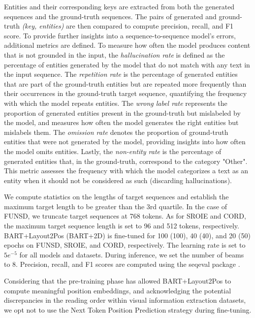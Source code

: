 Entities and their corresponding keys are extracted from both the generated sequences and the ground-truth sequences. The pairs of generated and ground-truth \textit{(key, entities)} are then compared to compute precision, recall, and F1 score. To provide further insights into a sequence-to-sequence model's errors, additional metrics are defined. To measure how often the model produces content that is not grounded in the input, the \textit{hallucination rate} is defined as the percentage of entities generated by the model that do not match with any text in the input sequence. The \textit{repetition rate} is the percentage of generated entities that are part of the ground-truth entities but are repeated more frequently than their occurrences in the ground-truth target sequence, quantifying the frequency with which the model repeats entities. The \textit{wrong label rate} represents the proportion of generated entities present in the ground-truth but mislabeled by the model, and measures how often the model generates the right entities but mislabels them. The \textit{omission rate} denotes the proportion of ground-truth entities that were not generated by the model, providing insights into how often the model omits entities. Lastly, the \textit{non-entity rate} is the percentage of generated entities that, in the ground-truth, correspond to the category "Other". This metric assesses the frequency with which the model categorizes a text as an entity when it should not be considered as such (discarding hallucinations).



We compute statistics on the lengths of target sequences and establish the maximum target length to be greater than the 3rd quartile. In the case of FUNSD, we truncate target sequences at 768 tokens. As for SROIE and CORD, the maximum target sequence length is set to 96 and 512 tokens, respectively. BART+Layout2Pos (BART+2D) is fine-tuned for 100 (100), 40 (40), and 20 (50) epochs on FUNSD, SROIE, and CORD, respectively. The learning rate is set to $5e^{-5}$ for all models and datasets. During inference, we set the number of beams to 8. Precision, recall, and F1 scores are computed using the seqeval package \citep{seqeval}. 

Considering that the pre-training phase has allowed BART+Layout2Pos to compute meaningful position embeddings, and acknowledging the potential discrepancies in the reading order within visual information extraction datasets, we opt not to use the Next Token Position Prediction strategy during fine-tuning.

